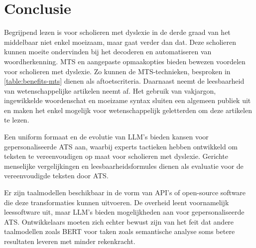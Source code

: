 \section{Conclusie}


Begrijpend lezen is voor scholieren met dyslexie in de derde graad van het middelbaar niet enkel moeizaam, maar gaat verder dan dat. Deze scholieren kunnen moeite ondervinden bij het decoderen en automatiseren van woordherkenning. MTS en aangepaste opmaakopties bieden bewezen voordelen voor scholieren met dyslexie. Zo kunnen de MTS-technieken, besproken in \ref{table:benefits-mts} dienen als aftoetscriteria. Daarnaast neemt de leesbaarheid van wetenschappelijke artikelen neemt af. Het gebruik van vakjargon, ingewikkelde woordenschat en moeizame syntax sluiten een algemeen publiek uit en maken het enkel mogelijk voor wetenschappelijk geletterden om deze artikelen te lezen.

% 

Een uniform formaat en de evolutie van LLM's bieden kansen voor gepersonaliseerde ATS aan, waarbij experts tactieken hebben ontwikkeld om teksten te vereenvoudigen op maat voor scholieren met dyslexie. Gerichte menselijke vergelijkingen en leesbaarheidsformules dienen als evaluatie voor de vereenvoudigde teksten door ATS.

Er zijn taalmodellen beschikbaar in de vorm van API's of open-source software die deze transformaties kunnen uitvoeren. De overheid leent voornamelijk leessoftware uit, maar LLM's bieden mogelijkheden aan voor gepersonaliseerde ATS. Ontwikkelaars moeten zich echter bewust zijn van het feit dat andere taalmodellen zoals BERT voor taken zoals semantische analyse soms betere resultaten leveren met minder rekenkracht.